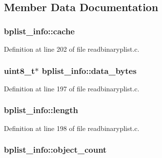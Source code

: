 \subsection{Member Data Documentation}
\subsubsection[{\texorpdfstring{cache}{cache}}]{ bplist\+\_\+info\+::cache}\hypertarget{structbplist__info_a3ea7b1feecc7c5fa1f988e39f57c7c4a}{}\label{structbplist__info_a3ea7b1feecc7c5fa1f988e39f57c7c4a}


Definition at line 202 of file readbinaryplist.\+c.

\subsubsection[{\texorpdfstring{data\+\_\+bytes}{data_bytes}}]{ {\bf uint8\+\_\+t}$\ast$ bplist\+\_\+info\+::data\+\_\+bytes}\hypertarget{structbplist__info_ab0c039cf2d64b066815b31f648f3e165}{}\label{structbplist__info_ab0c039cf2d64b066815b31f648f3e165}


Definition at line 197 of file readbinaryplist.\+c.

\subsubsection[{\texorpdfstring{length}{length}}]{ bplist\+\_\+info\+::length}\hypertarget{structbplist__info_ae15894e235d748166b0c928e0a36670f}{}\label{structbplist__info_ae15894e235d748166b0c928e0a36670f}


Definition at line 198 of file readbinaryplist.\+c.

\subsubsection[{\texorpdfstring{object\+\_\+count}{object_count}}]{ bplist\+\_\+info\+::object\+\_\+count}\hypertarget{structbplist__info_a2664eb47360dff6639f4085a50f321c9}{}\label{structbplist__info_a2664eb47360dff6639f4085a50f321c9}


